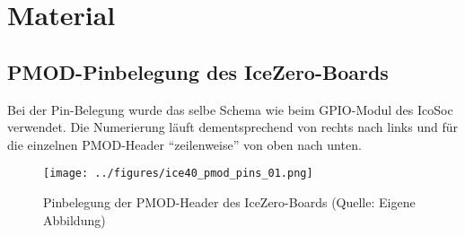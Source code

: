 \chapter{Material}
\label{ch:Material}
\enlargethispage{120cm}
\section{PMOD-Pinbelegung des IceZero-Boards}

Bei der Pin-Belegung wurde das selbe Schema wie beim GPIO-Modul des IcoSoc verwendet. Die Numerierung läuft dementsprechend von rechts nach links und für die einzelnen PMOD-Header ``zeilenweise'' von oben nach unten.

\begin{figure}[h]
	\centering
	\captionsetup{justification=centering,margin=2cm}
		\texttt{[image: ../figures/ice40\_pmod\_pins\_01.png]}
		\caption[Pinbelegung der PMOD-Header des IceZero-Boards]{Pinbelegung der PMOD-Header des IceZero-Boards (Quelle: Eigene Abbildung)}
	\label{fig:ice40_pmod_pins}
\end{figure}

\begin{table}[h]
\centering
{}
\caption{Pinbelegung der PMOD-Header des Icezero-Boards}
\label{tbl:PMOD-Pins}
\end{table}


